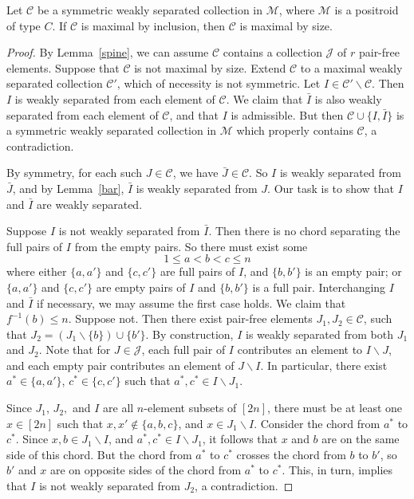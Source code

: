 \documentclass[ALCO,ThmDefs,Unicode,epreuves]{cedram}
\begin{document}
\begin{lemm}\label{ifspine} 
Let $\mathcal{C}$ be a symmetric weakly separated collection in $\mathcal{M}$, where $\mathcal{M}$ is a positroid of type $C$. If $\mathcal{C}$ is maximal by inclusion, then $\mathcal{C}$ is maximal by size.
\end{lemm}

\begin{proof}
By Lemma~\ref{spine}, we can assume $\mathcal{C}$ contains a collection $\mathcal{J}$ of $r$ pair-free elements. Suppose that $\mathcal{C}$ is not maximal by size. Extend $\mathcal{C}$ to a maximal weakly separated collection $\mathcal{C}'$, which of necessity is not symmetric. Let $I \in \mathcal{C}' \backslash \mathcal{C}.$ Then $I$ is weakly separated from each element of $\mathcal{C}$. We claim that $\bar{I}$ is also weakly separated from each element of $\mathcal{C}$, and that $I$ is admissible. But then $\mathcal{C} \cup \{I,\bar{I}\}$ is a symmetric weakly separated collection in $\mathcal{M}$ which properly contains $\mathcal{C}$, a contradiction.

By symmetry, for each such $J \in \mathcal{C}$, we have $\bar{J} \in \mathcal{C}$. So $I$ is weakly separated from~$\bar{J}$, and by Lemma~\ref{bar}, $\bar{I}$ is weakly separated from $J$. Our task is to show that $I$ and $\bar{I}$ are weakly separated. 

Suppose $I$ is not weakly separated from $\bar{I}$. Then there is no chord separating the full pairs of $I$ from the empty pairs. So there must exist some
\[1 \leq a < b < c \leq n\]
where either $\{a,a'\}$ and $\{c,c'\}$ are full pairs of $I$, and $\{b,b'\}$ is an empty pair; or $\{a,a'\}$ and $\{c,c'\}$ are empty pairs of $I$ and $\{b,b'\}$ is a full pair. Interchanging $I$ and $\bar{I}$ if necessary, we may assume the first case holds. We claim that $f^{-1}(b) \leq n$. Suppose not. Then there exist pair-free elements $J_1,J_2 \in \mathcal{C}$, such that $J_2 =( J_1 \backslash \{b\}) \cup \{b'\}$. By construction, $I$ is weakly separated from both $J_1$ and $J_2$. Note that for $J \in \mathcal{J}$, each full pair of $I$ contributes an element to $I \backslash J$, and each empty pair contributes an element of $J\backslash I$. In particular, there exist $a^* \in \{a,a'\}$, $c^* \in \{c,c'\}$ such that $a^*, c^* \in I \backslash J_1$.

Since $J_1$, $J_2,$ and $I$ are all $n$-element subsets of $[2n]$, there must be at least one $x \in [2n]$ such that $x,x' \not\in \{a,b,c\}$, and $x \in J_1 \backslash I$. Consider the chord from $a^*$ to $c^*$. Since $x,b \in J_1 \backslash I$, and $a^*, c^* \in I \backslash J_1$, it follows that $x$ and $b$ are on the same side of this chord. But the chord from $a^*$ to $c^*$ crosses the chord from $b$ to $b'$, so $b'$ and $x$ are on opposite sides of the chord from $a^*$ to $c^*$. This, in turn, implies that $I$ is not weakly separated from $J_2$, a contradiction.


\end{proof}
\end{document}
